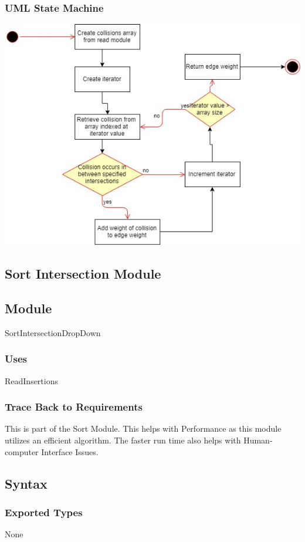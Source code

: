 \documentclass[12pt]{article}
\begin{document}
\subsubsection*{UML State Machine}
\includegraphics[scale=0.725]{UMLSM-SearchCollision.png}

\newpage
\subsection{Sort Intersection Module}
\subsection*{Module}
SortIntersectionDropDown

\subsubsection*{Uses}
ReadInsertions

\subsubsection*{Trace Back to Requirements}
This is part of the Sort Module. This helps with Performance as this module utilizes an efficient algorithm. The faster run time also helps with Human-computer Interface Issues.

\subsection*{Syntax}
\subsubsection*{Exported Types}
None
\end{document}
